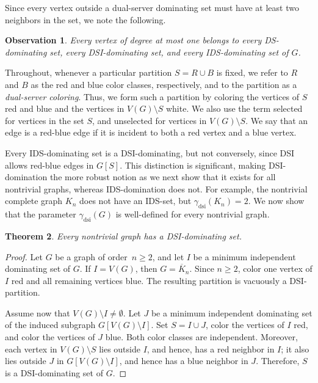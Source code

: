 \documentclass[11pt]{article}
\newtheorem{theorem}{Theorem}
\newtheorem{observation}[theorem]{Observation}
\theoremstyle{definition}
\theoremstyle{remark}
\newcommand{\dsi}{\mathrm{dsi}}
\newcommand{\barK}{\overline{K}}
\begin{document}
Since every vertex outside a dual-server dominating set must have at least two neighbors in the set, we note the following.

\begin{observation}
\label{ob:leaf}
Every vertex of degree at most one belongs to every DS-dominating set, every
DSI-dominating set, and every IDS-dominating set of \(G\).
\end{observation}


Throughout, whenever a particular
partition \(S=R\cup B\) is fixed, we refer to \(R\) and \(B\) as the red and
blue color classes, respectively, and to the partition as a
\emph{dual-server coloring}. Thus, we form such  a  partition by coloring the vertices of $S$ red and blue and the vertices in  \(V(G) \setminus S\)
white. We also use the term selected for vertices in the set \(S\), and
unselected for vertices in \(V(G) \setminus S\).  We say that an edge is a red-blue edge if it is incident to both a red vertex and a blue vertex. 

Every IDS-dominating set is a  DSI-dominating, but not conversely, since DSI allows red-blue edges in \(G[S]\). This
distinction is significant, making DSI-domination the more robust notion as we next show that it exists for all nontrivial graphs, whereas IDS-domination does not.  For example, the nontrivial complete graph $K_n$ does not have an IDS-set, but $\gamma_{\dsi}(K_n) = 2$.
We now show that  the parameter \(\gamma_{\dsi}(G)\) is
well-defined for every nontrivial graph.

\begin{theorem}
\label{thm:dsi-exists}
Every nontrivial graph has a DSI-dominating set.
\end{theorem}

\begin{proof}
Let \(G\) be a graph of order~$n \ge 2$, and let \(I\) be a minimum
independent dominating set of \(G\). If \(I=V(G)\), then \(G = \barK_n\).
Since \(n \ge 2\), color one vertex of \(I\) red and all remaining
vertices blue. The resulting partition is vacuously a DSI-partition.

Assume now that \(V(G)\setminus I\neq \emptyset\). Let \(J\) be a minimum
independent dominating set of the induced subgraph \(G[V(G)\setminus I]\).
Set \(S=I\cup J\), color the vertices of \(I\) red, and color the vertices of
\(J\) blue. Both color classes are independent. Moreover, each vertex in
\(V(G)\setminus S\) lies outside \(I\), and hence, has a red neighbor in
\(I\); it also lies outside \(J\) in \(G[V(G)\setminus I]\), and hence has a
blue neighbor in \(J\). Therefore, \(S\) is a DSI-dominating set of \(G\).
\end{proof}
\end{document}
